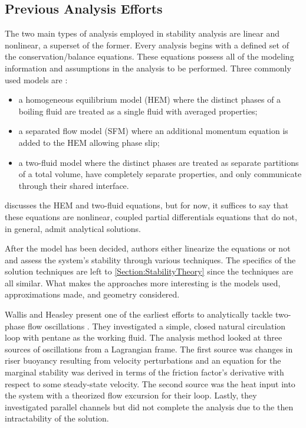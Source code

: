 \subsection{Previous Analysis Efforts}
The two main types of analysis employed in stability analysis are linear and nonlinear, a superset of the former.
Every analysis begins with a defined set of the conservation/balance equations.
These equations possess all of the modeling information and assumptions in the analysis to be performed.
Three commonly used models are \cite{johnson_handbook_1998}:
\begin{itemize}
    \item{a homogeneous equilibrium model (HEM) where the distinct phases of a boiling fluid are treated as a single fluid with averaged properties;}
    \item{a separated flow model (SFM) where an additional momentum equation is added to the HEM allowing phase slip;}
    \item{a two-fluid model where the distinct phases are treated as separate partitions of a total volume, have completely separate properties, and only communicate through their shared interface.}
\end{itemize}
 discusses the HEM and two-fluid equations, but for now, it suffices to say that these equations are nonlinear, coupled partial differentials equations that do not, in general, admit analytical solutions.

After the model has been decided, authors either linearize the equations or not and assess the system's stability through various techniques.
The specifics of the solution techniques are left to \cref{Section:StabilityTheory} since the techniques are all similar.
What makes the approaches more interesting is the models used, approximations made, and geometry considered.

Wallis and Heasley present one of the earliest efforts to analytically tackle two-phase flow oscillations \cite{wallis_oscillations_1961}.
They investigated a simple, closed natural circulation loop with pentane as the working fluid.
The analysis method looked at three sources of oscillations from a Lagrangian frame.
The first source was changes in riser buoyancy resulting from velocity perturbations and an equation for the marginal stability was derived in terms of the friction factor's derivative with respect to some steady-state velocity.
The second source was the heat input into the system with a theorized flow excursion for their loop.
Lastly, they investigated parallel channels but did not complete the analysis due to the then intractability of the solution.

